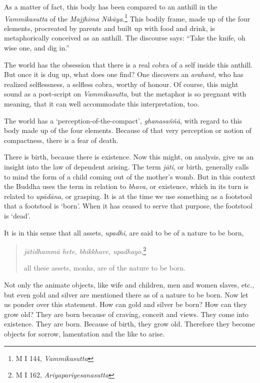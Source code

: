 As a matter of fact, this body has been compared to an anthill in the \emph{Vammikasutta} of the \emph{Majjhima Nikāya}.\footnote{M I 144, \emph{Vammikasutta}} This bodily frame, made up of the four elements, procreated by parents and built up with food and drink, is metaphorically conceived as an anthill. The discourse says: ``Take the knife, oh wise one, and dig in.''

The world has the obsession that there is a real cobra of a self inside this anthill. But once it is dug up, what does one find? One discovers an \emph{arahant}, who has realized selflessness, a selfless cobra, worthy of honour. Of course, this might sound as a post-script on \emph{Vammikasutta}, but the metaphor is so pregnant with meaning, that it can well accommodate this interpretation, too.

The world has a `perception-of-the-compact', \emph{ghanasaññā}, with regard to this body made up of the four elements. Because of that very perception or notion of compactness, there is a fear of death.

There is birth, because there is existence. Now this might, on analysis, give us an insight into the law of dependent arising. The term \emph{jāti}, or birth, generally calls to mind the form of a child coming out of the mother's womb. But in this context the Buddha uses the term in relation to \emph{bhava}, or existence, which in its turn is related to \emph{upādāna}, or grasping. It is at the time we use something as a footstool that a footstool is `born'. When it has ceased to serve that purpose, the footstool is `dead'.

It is in this sense that all assets, \emph{upadhi}, are said to be of a nature to be born,

\begin{quote}
\emph{jātidhammā hete, bhikkhave, upadhayo},\footnote{M I 162, \emph{Ariyapariyesanasutta}}

all these assets, monks, are of the nature to be born.
\end{quote}

Not only the animate objects, like wife and children, men and women slaves, etc., but even gold and silver are mentioned there as of a nature to be born. Now let us ponder over this statement. How can gold and silver be born? How can they grow old? They are born because of craving, conceit and views. They come into existence. They are born. Because of birth, they grow old. Therefore they become objects for sorrow, lamentation and the like to arise.

